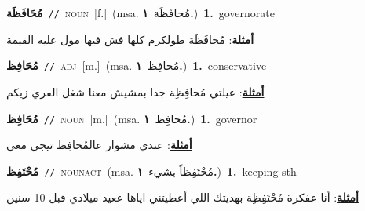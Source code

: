 \documentclass[10pt,a4paper,twoside]{article} %
\begin{document}
\begin{multicols}{2}
{\setlength\topsep{0pt}\textbf{\foreignlanguage{arabic}{مُحَافَظَة}}\ {\color{gray}\texttt{//}\color{black}}\ \textsc{noun}\ [f.]\ \color{gray}(msa. \foreignlanguage{arabic}{مُحافَظَة}~\foreignlanguage{arabic}{\textbf{١.}})\color{black}\ \textbf{1.}~governorate\  \begin{flushright}\color{gray}\foreignlanguage{arabic}{\textbf{\underline{\foreignlanguage{arabic}{أمثلة}}}: مُحافَظَة طولكرم كلها فش فيها مول عليه القيمة}\end{flushright}\color{black}} \vspace{2mm}

{\setlength\topsep{0pt}\textbf{\foreignlanguage{arabic}{مُحَافِظ}}\ {\color{gray}\texttt{//}\color{black}}\ \textsc{adj}\ [m.]\ \color{gray}(msa. \foreignlanguage{arabic}{مُحافِظ}~\foreignlanguage{arabic}{\textbf{١.}})\color{black}\ \textbf{1.}~conservative\  \begin{flushright}\color{gray}\foreignlanguage{arabic}{\textbf{\underline{\foreignlanguage{arabic}{أمثلة}}}: عيلتي مُحافِظِة جدا بمشيش معنا شغل الفري زيكم}\end{flushright}\color{black}} \vspace{2mm}

{\setlength\topsep{0pt}\textbf{\foreignlanguage{arabic}{مُحَافِظ}}\ {\color{gray}\texttt{//}\color{black}}\ \textsc{noun}\ [m.]\ \color{gray}(msa. \foreignlanguage{arabic}{مُحافِظ}~\foreignlanguage{arabic}{\textbf{١.}})\color{black}\ \textbf{1.}~governor\  \begin{flushright}\color{gray}\foreignlanguage{arabic}{\textbf{\underline{\foreignlanguage{arabic}{أمثلة}}}: عندي مشوار عالمُحافِظ تيجي معي}\end{flushright}\color{black}} \vspace{2mm}

{\setlength\topsep{0pt}\textbf{\foreignlanguage{arabic}{مُحْتَفِظ}}\ {\color{gray}\texttt{//}\color{black}}\ \textsc{noun\textunderscore act}\ \color{gray}(msa. \foreignlanguage{arabic}{مُحْتَفِظاً بشيء}~\foreignlanguage{arabic}{\textbf{١.}})\color{black}\ \textbf{1.}~keeping sth\  \begin{flushright}\color{gray}\foreignlanguage{arabic}{\textbf{\underline{\foreignlanguage{arabic}{أمثلة}}}: أنا عفكرة مُحْتَفِظِة بهديتك اللي أعطيتني اياها ععيد ميلادي قبل 10 سنين}\end{flushright}\color{black}} \vspace{2mm}


\end{multicols}
\end{document}
